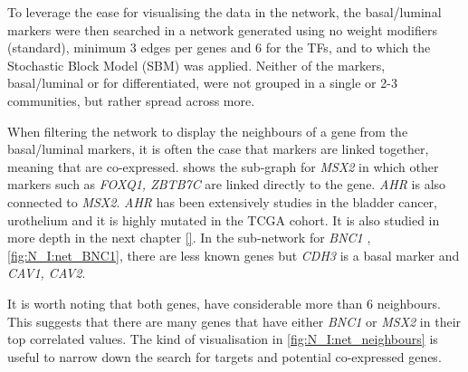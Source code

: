 To leverage the ease for visualising the data in the network, the basal/luminal markers were then searched in a network generated using no weight modifiers (standard), minimum 3 edges per genes and 6 for the TFs, and to which the Stochastic Block Model (SBM) was applied. Neither of the markers, basal/luminal or for differentiated, were not grouped in a single or 2-3 communities, but rather spread across more.

When filtering the network to display the neighbours of a  gene from the basal/luminal markers, it is often the case that markers are linked together, meaning that are co-expressed.  shows the sub-graph for \textit{MSX2} in which other markers such as \textit{FOXQ1, ZBTB7C} are linked directly to the gene. \textit{AHR} is also connected to \textit{MSX2}. \textit{AHR} has been extensively studies in the bladder cancer, urothelium and it is highly mutated in the TCGA cohort. It is also studied in more depth in the next chapter \ref{}. In the sub-network for \textit{BNC1} , \cref{fig:N_I:net_BNC1}, there are less known genes but \textit{CDH3} is a basal marker\citet{Dadhania2016-cb} and \textit{CAV1, CAV2}. 

It is worth noting that both genes, have considerable more than 6 neighbours. This suggests that there are many genes that have either \textit{BNC1} or \textit{MSX2} in their top correlated values. The kind of visualisation in \cref{fig:N_I:net_neighbours} is useful to narrow down the search for targets and potential co-expressed genes.

